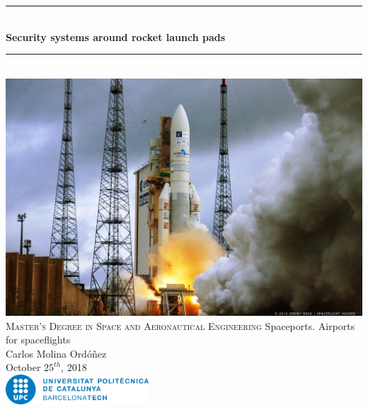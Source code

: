 
\begin{titlepage}

\newcommand{\HRule}{\rule{\linewidth}{0.5mm}} %

\center %


\HRule \\[0.2cm]
{ \Large \bfseries
Security systems around rocket launch pads\\
}
\HRule \\[1.1cm]

\includegraphics[width=\textwidth]{img/Ariane-5-launch.jpg}
\\[0.8cm]

\textsc{\large Master's Degree in Space and Aeronautical Engineering}
\large Spaceports. Airports for spaceflights\\[0.8cm]

{ \normalsize Carlos Molina Ordóñez}\\

{\normalsize October $25^{th}$, 2018}\\[1cm] %

\includegraphics[width=0.4\textwidth]{img/UPC_logo.jpg}\\[0.4cm]


\vfill %

\end{titlepage}

